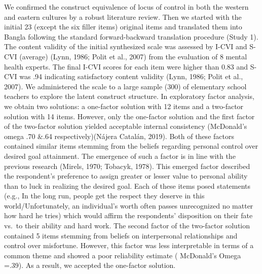 \documentclass[
  english,
  man]{apa6}
\begin{document}
We confirmed the construct equivalence of locus of control in both the western and eastern cultures by a robust literature review. Then we started with the initial 23 (except the six filler items) original items and translated them into Bangla following the standard forward-backward translation procedure (Study 1). The content validity of the initial synthesized scale was assessed by I-CVI and S-CVI (average) (Lynn, 1986; Polit et al., 2007) from the evaluation of 8 mental health experts. The final I-CVI scores for each item were higher than 0.83 and S-CVI was .94 indicating satisfactory content validity (Lynn, 1986; Polit et al., 2007). We administered the scale to a large sample (300) of elementary school teachers to explore the latent construct structure. In exploratory factor analysis, we obtain two solutions: a one-factor solution with 12 items and a two-factor solution with 14 items. However, only the one-factor solution and the first factor of the two-factor solution yielded acceptable internal consistency (McDonald's omega .70 \&.64 respectively)(Nájera Catalán, 2019). Both of these factors contained similar items stemming from the beliefs regarding personal control over desired goal attainment. The emergence of such a factor is in line with the previous research (Mirels, 1970; Tobacyk, 1978). This emerged factor described the respondent's preference to assign greater or lesser value to personal ability than to luck in realizing the desired goal. Each of these items posed statements (e.g., In the long run, people get the respect they deserve in this world/Unfortunately, an individual's worth often passes unrecognized no matter how hard he tries) which would affirm the respondents' disposition on their fate vs.~to their ability and hard work. The second factor of the two-factor solution contained 5 items stemming from beliefs on interpersonal relationships and control over misfortune. However, this factor was less interpretable in terms of a common theme and showed a poor reliability estimate ( McDonald's Omega =.39). As a result, we accepted the one-factor solution.
\end{document}
